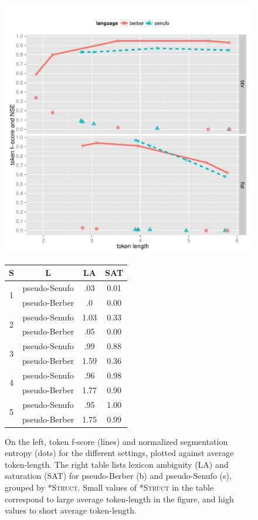 \documentclass[11pt]{article}
\begin{document}
\begin{figure}[t!]
\begin{minipage}[t]{0.50\paperwidth}%
\vspace{-50pt}
	\includegraphics[scale=0.55]{plots/bens_version.pdf}
\end{minipage}%
\begin{minipage}[t][1\totalheight][c]{0.3\paperwidth}%
\vspace{0pt}
\begin{tabular}{|c|c|c|c|}
\hline 
S & L & LA & SAT\tabularnewline
\hline 
\hline 
\multirow{2}{*}{1} & pseudo-Senufo & .03 & 0.01\tabularnewline
\cline{2-4} 
 & pseudo-Berber & .0 & 0.00\tabularnewline
\hline 
\hline 
\multirow{2}{*}{2} & pseudo-Senufo & 1.03 & 0.33\tabularnewline
\cline{2-4} 
 & pseudo-Berber & .05 & 0.00\tabularnewline
\hline 
\hline 
\multirow{2}{*}{3} & pseudo-Senufo & .99 & 0.88\tabularnewline
\cline{2-4} 
 & pseudo-Berber & 1.59 & 0.36\tabularnewline
\hline 
\hline 
\multirow{2}{*}{4} & pseudo-Senufo & .96 & 0.98\tabularnewline
\cline{2-4} 
 & pseudo-Berber & 1.77 & 0.90\tabularnewline
\hline 
\hline 
\multirow{2}{*}{5} & pseudo-Senufo & .95 & 1.00\tabularnewline
\cline{2-4} 
 & pseudo-Berber & 1.75 & 0.99\tabularnewline
\hline 
\end{tabular}
\end{minipage}
\caption{\label{Results.} On the left, token f-score (lines) and normalized segmentation entropy (dots) for the different settings, plotted against average token-length. The right table lists lexicon ambiguity (LA) and saturation (SAT) for pseudo-Berber (b) and pseudo-Senufo (s), grouped by \textsc{*Struct}. Small values of \textsc{*Struct} in the table correspond to large average token-length in the figure, and high values to short average token-length.}
\end{figure}
\end{document}
